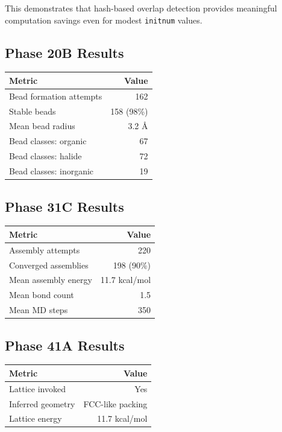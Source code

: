 \documentclass[11pt,a4paper]{article}
\begin{document}
\noindent This demonstrates that hash-based overlap detection provides
meaningful computation savings even for modest \texttt{initnum} values.

\subsection{Phase 20B Results}

\begin{center}
\begin{tabular}{lr}
\toprule
\textbf{Metric} & \textbf{Value} \\
\midrule
Bead formation attempts & 162 \\
Stable beads            & 158 (98\%) \\
Mean bead radius        & 3.2 \AA \\
Bead classes: organic   & 67 \\
Bead classes: halide    & 72 \\
Bead classes: inorganic & 19 \\
\bottomrule
\end{tabular}
\end{center}

\subsection{Phase 31C Results}

\begin{center}
\begin{tabular}{lr}
\toprule
\textbf{Metric} & \textbf{Value} \\
\midrule
Assembly attempts       & 220 \\
Converged assemblies    & 198 (90\%) \\
Mean assembly energy    & 11.7 kcal/mol \\
Mean bond count         & 1.5 \\
Mean MD steps           & 350 \\
\bottomrule
\end{tabular}
\end{center}

\subsection{Phase 41A Results}

\begin{center}
\begin{tabular}{lr}
\toprule
\textbf{Metric} & \textbf{Value} \\
\midrule
Lattice invoked  & Yes \\
Inferred geometry & FCC-like packing \\
Lattice energy   & 11.7 kcal/mol \\
\bottomrule
\end{tabular}
\end{center}
\end{document}
